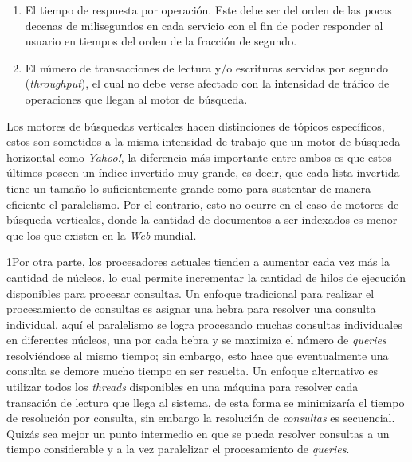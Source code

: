 \begin{enumerate}
  \item El tiempo de respuesta por operación. Este debe ser del orden de las pocas decenas de milisegundos en cada servicio con el fin de poder responder al usuario en tiempos del orden de la fracción de segundo.
  \item El número de transacciones de lectura y/o escrituras servidas por segundo (\textit{throughput}), el cual no debe verse afectado con la intensidad de tráfico de operaciones que llegan al motor de búsqueda.
\end{enumerate}

Los motores de búsquedas verticales hacen distinciones de tópicos específicos, estos son sometidos a la misma intensidad de trabajo que un motor de búsqueda horizontal como \textit{Yahoo!}, la diferencia más importante entre ambos es que estos últimos poseen un índice invertido muy grande, es decir, que cada lista invertida tiene un tamaño lo suficientemente grande como para sustentar de manera eficiente el paralelismo. Por el contrario, esto no ocurre en el caso de motores de búsqueda verticales, donde la cantidad de documentos a ser indexados es menor que los que existen en la \textit{Web} mundial.

1Por otra parte, los procesadores actuales tienden a aumentar cada vez más la cantidad de núcleos, lo cual permite incrementar la cantidad de hilos de ejecución disponibles para procesar consultas. Un enfoque tradicional para realizar el procesamiento de consultas es asignar una hebra para resolver una consulta individual, aquí el paralelismo se logra procesando muchas consultas individuales en diferentes núcleos, una por cada hebra y se maximiza el número de \textit{queries} resolviéndose al mismo tiempo; sin embargo, esto hace que eventualmente una consulta se demore mucho tiempo en ser resuelta. Un enfoque alternativo es utilizar todos los \textit{threads} disponibles en una máquina para resolver cada transación de lectura que llega al sistema, de esta forma se minimizaría el tiempo de resolución por consulta, sin embargo la resolución de \textit{consultas} es secuencial. Quizás sea mejor un punto intermedio en que se pueda resolver consultas a un tiempo considerable y a la vez paralelizar el procesamiento de \textit{queries}.

